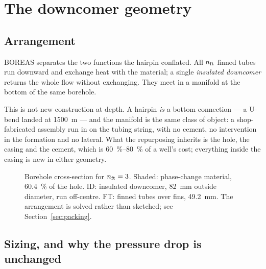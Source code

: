 \section{The downcomer geometry}
\label{sec:geometry}

\subsection{Arrangement}

BOREAS separates the two functions the hairpin conflated. All $n_{\mathrm{ft}}$ finned
tubes run downward and exchange heat with the material; a single
\emph{insulated downcomer} returns the whole flow without exchanging. They
meet in a manifold at the bottom of the same borehole.

This is not new construction at depth. A hairpin \emph{is} a bottom
connection --- a U-bend landed at \SI{1500}{\metre} --- and the manifold is
the same class of object: a shop-fabricated assembly run in on the tubing
string, with no cement, no intervention in the formation and no lateral. What
the repurposing inherits is the hole, the casing and the cement, which is
\SIrange{60}{80}{\percent} of a well's cost; everything inside the casing is
new in either geometry.

\begin{figure}[h]
\centering
{}
\caption{Borehole cross-section for $n_{\mathrm{ft}} = 3$. Shaded: phase-change material,
\SI{60.4}{\percent} of the hole. ID: insulated downcomer,
\SI{82}{\milli\metre} outside diameter, run off-centre. FT: finned tubes over
fins, \SI{49.2}{\milli\metre}. The arrangement is solved rather than sketched;
see Section~\ref{sec:packing}.}
\label{fig:xsec}
\end{figure}

\subsection{Sizing, and why the pressure drop is unchanged}

